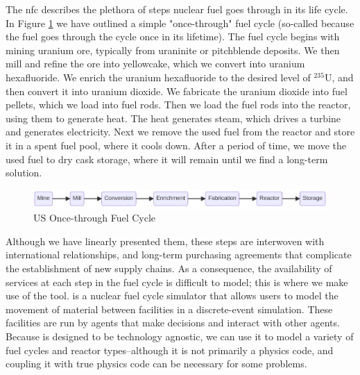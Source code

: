 The \gls{nfc} describes the plethora of steps nuclear fuel goes through
in its life cycle. In Figure \ref{fig:once-through} we have outlined a
simple "once-through" fuel cycle (so-called because the fuel goes through
the cycle once in its lifetime). The fuel cycle begins with mining uranium ore, typically from uraninite or pitchblende deposits. We then mill and refine the ore into yellowcake, which we convert into uranium hexafluoride. We enrich the uranium hexafluoride to the desired level of $^{235}$U, and then convert it into uranium dioxide. We fabricate the uranium dioxide into fuel pellets, which we load into fuel rods. Then we load the fuel rods into the reactor, using them to generate heat. The heat generates steam, which drives a turbine and generates electricity. Next we remove the used fuel from the reactor and store it in a spent fuel pool, where it cools down. After a period of time, we move the used fuel to dry cask storage, where it will remain until we find a long-term solution.

\begin{figure}[h]
    \centering
    \includegraphics[scale=0.40]{images/once_through_fc.png}
    \caption{US Once-through Fuel Cycle}
    \label{fig:once-through}
\end{figure}

Although we have linearly presented them, these steps are interwoven with international relationships, and long-term purchasing agreements that complicate the establishment of new supply chains. As a consequence, the availability of services at each step in the fuel cycle is difficult to model; this is where we make use of the \cyclus \cite{huff_cyclus_intro_2016} tool. \cyclus is a nuclear fuel cycle simulator that allows users to model the movement of material between facilities in a discrete-event simulation. These facilities are run by agents that make decisions and interact with other agents. Because \cyclus is designed to be technology agnostic, we can use it to model a variety of fuel cycles and reactor types--although it is not primarily a physics code, and coupling it with true physics code can be necessary for some problems.

